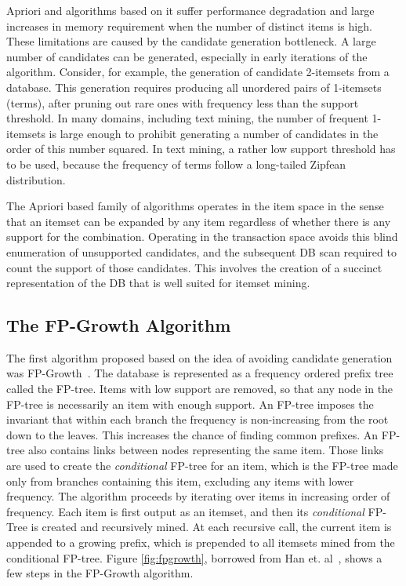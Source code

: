 \documentclass[letterpaper,12pt,titlepage,oneside,final]{book}
\begin{document}
Apriori and algorithms based on it suffer performance degradation 
and  large increases in memory requirement
when the number of distinct items is high.
These limitations are caused by the candidate generation bottleneck.
A large number of candidates can be generated,
especially in early iterations of the algorithm.
Consider, for example, the generation of candidate 2-itemsets from a database.
This generation requires producing all unordered pairs of 1-itemsets (terms),
after pruning out rare ones with frequency less than the support threshold.
In many domains, including text mining, the number of frequent 1-itemsets is
large enough to prohibit generating a number of candidates in the order of this
number squared.
In text mining, a rather low support threshold has to be used, because the
frequency of terms follow a long-tailed Zipfean distribution.

The Apriori based family of algorithms operates in the item space 
in the sense that an itemset can be expanded by any item regardless
of whether there is any support for the combination. 
Operating in the transaction space avoids this blind enumeration
of unsupported candidates, and the subsequent DB scan required 
to count the support of those candidates. 
This involves the creation of a succinct representation of the DB
that is well suited for itemset mining.

\subsection{The FP-Growth Algorithm}
The first algorithm proposed based on the idea of avoiding candidate
generation was FP-Growth~\cite{han2000mining}.
The database is represented as a frequency ordered prefix tree called the FP-tree.
Items with low support are removed, so that 
any node in the FP-tree is necessarily an item with enough support.
An FP-tree imposes the invariant that within each branch the frequency is
non-increasing from the root down to the leaves. 
This increases the chance of finding common prefixes.
An FP-tree also contains links between nodes representing the same item.
Those links are used to create the \emph{conditional} FP-tree for an item,
which is the FP-tree made only from branches containing this item, 
excluding any items with lower frequency.
The algorithm proceeds by iterating over items in increasing order 
of frequency. 
Each item is first output as an itemset,
and then its \emph{conditional} FP-Tree is created and recursively mined. 
At each recursive call, the current item is appended to a growing prefix,
which is prepended to all itemsets mined from the conditional FP-tree.
Figure \ref{fig:fpgrowth}, borrowed from Han et. al~\cite{han2004mining}, shows a few steps in the FP-Growth algorithm.
\end{document}
